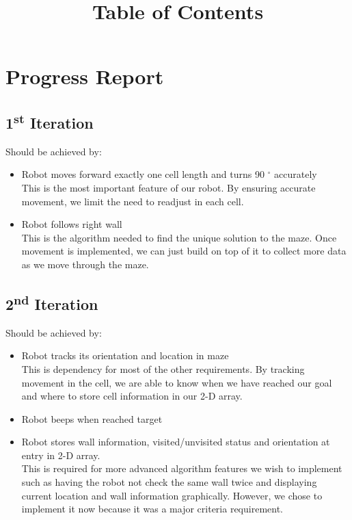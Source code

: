 \documentclass[11pt]{article}
\date{}
\title{Table of Contents}
\newcommand{\ts}{\textsuperscript}
\begin{document}



\maketitle

\tableofcontents

\newpage


\section{Progress Report}
\subsection{1\ts{st} Iteration}

Should be achieved by:
\begin{itemize}
\item Robot moves forward exactly one cell length and turns 90 $^{\circ}$ accurately\\
This is the most important feature of our robot. By ensuring accurate movement, we limit the need to readjust in each cell.
\item Robot follows right wall\\
This is the algorithm needed to find the unique solution to the maze. Once movement is implemented, we can just build on top of it to collect more data as we move through the maze. 
\end{itemize}

\subsection{2\ts{nd} Iteration}

Should be achieved by:
\begin{itemize}
\item Robot tracks its orientation and location in maze\\
This is dependency for most of the other requirements. By tracking movement in the cell, we are able to know when we have reached our goal and where to store cell information in our 2-D array.
\item Robot beeps when reached target
\item Robot stores wall information, visited/unvisited status and orientation at entry in 2-D array.\\
This is required for more advanced algorithm features we wish to implement such as having the robot not check the same wall twice and displaying current location and wall information graphically. However, we chose to implement it now because it was a major criteria requirement. 
\end{itemize}
\end{document}
